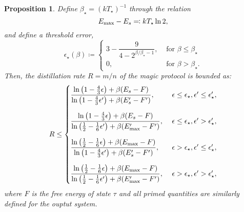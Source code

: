 \documentclass[
twocolumn,
superscriptaddress
]{revtex4-1}
\newtheorem{proposition}[theorem]{Proposition}
\begin{document}
\begin{proposition}
Define $\beta_\star = (k T_\star)^{-1}$ through the relation
\begin{equation}
	E_{\rm max} - E_s \eqqcolon kT_\star \ln 2,
\end{equation}
and define a threshold error,
\begin{equation}\label{eq:threshold}
	\epsilon_{\star}(\beta) \coloneqq 
	\begin{cases}
		3 - \dfrac{9}{4-2^{\beta/\beta_\star - 1}}, &\text{ for } \beta \leq \beta_\star \\
		0, &\text{ for } \beta > \beta_\star.
	\end{cases}
\end{equation}
Then, the distillation rate $R = m/n$ of the magic protocol is bounded as:
\begin{equation}
	R \leq
	\begin{cases}
		\dfrac{\ln \big( 1-\frac{4}{3}\epsilon \big) + \beta (E_s - F)}{\ln \big( 1-\frac{4}{3}\epsilon' \big) + \beta (E'_s - F')},\ &\epsilon \leq \epsilon_\star, \epsilon' \leq \epsilon'_\star, \vspace{10pt}\\
		\dfrac{\ln \big( 1-\frac{4}{3}\epsilon \big) + \beta (E_s - F)}{\ln \big( \frac{1}{2}-\frac{1}{6}\epsilon' \big) + \beta (E'_{\rm{max}} - F')},\ &\epsilon \leq \epsilon_\star, \epsilon' > \epsilon'_\star, \vspace{10pt}\\
		\dfrac{\ln \big( \frac{1}{2}-\frac{1}{6}\epsilon \big) + \beta (E_{\rm{max}} - F)}{\ln \big( 1-\frac{4}{3}\epsilon' \big) + \beta (E'_s - F')},\ &\epsilon > \epsilon_\star, \epsilon' \leq \epsilon'_\star, \vspace{10pt}\\
		\dfrac{\ln\big( \frac{1}{2}-\frac{1}{6}\epsilon \big) + \beta (E_{\rm{max}} - F)}{\ln \big( \frac{1}{2}-\frac{1}{6}\epsilon' \big) + \beta (E'_{\rm{max}} - F')},\ &\epsilon > \epsilon_\star, \epsilon' > \epsilon'_\star,
	\end{cases}
\end{equation}
where $F$ is the free energy of state $\tau$ and all primed quantities are similarly defined for the ouptut system.
\end{proposition}
\end{document}

